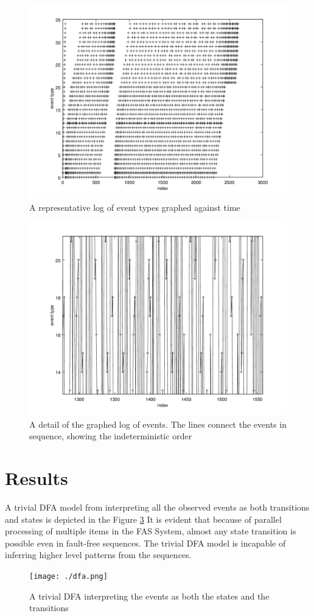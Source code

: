 \documentclass[journal]{IEEEtran}
\begin{document}
\begin{figure}[tb]
 \centering
 \includegraphics[width=8 cm,keepaspectratio=true]{./events.png}
 \caption{A representative log of event types graphed against time}
 \label{figure:events}
\end{figure}

\begin{figure}[tb]
 \centering
 \includegraphics[width=8 cm,keepaspectratio=true]{./zoomed_events.png}
 \caption{A detail of the graphed log of events. The lines connect the events in sequence, showing the indeterministic order}
 \label{figure:zoomed_events}
\end{figure}

\section{Results}

A trivial DFA model from interpreting all the observed events as both transitions and states is depicted in the Figure \ref{figure:trivial_DFA}
It is evident that because of parallel processing of multiple items in the FAS System, almost any state transition is
possible even in fault-free sequences. The trivial DFA model is incapable of inferring higher level patterns from the sequences.
\begin{figure}[tb]
 \centering
 \texttt{[image: ./dfa.png]}
 \caption{A trivial DFA interpreting the events as both the states and the transitions}
 \label{figure:trivial_DFA}
\end{figure}
\end{document}
